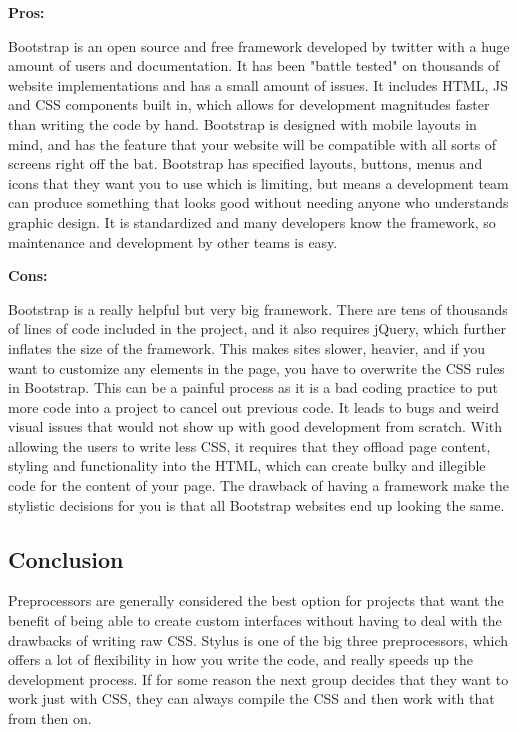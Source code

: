 \documentclass[draftclsnofoot,onecolumn,letterpaper,10pt,compsoc]{IEEEtran}
\begin{document}
    \noindent \textbf{Pros:}

    Bootstrap is an open source and free framework developed by twitter with a huge amount of users and documentation.\cite{bootstrap}
    It has been "battle tested" on thousands of website implementations and has a small amount of issues.
    It includes HTML, JS and CSS components built in, which allows for development magnitudes faster than writing the code by hand.
    Bootstrap is designed with mobile layouts in mind, and has the feature that your website will be compatible with all sorts of screens right off the bat.
    Bootstrap has specified layouts, buttons, menus and icons that they want you to use which is limiting, but means a development team can produce something that looks good without needing anyone who understands graphic design.
    It is standardized and many developers know the framework, so maintenance and development by other teams is easy.

    \noindent \textbf{Cons:}

    Bootstrap is a really helpful but very big framework.
    There are tens of thousands of lines of code included in the project, and it also requires jQuery, which further inflates the size of the framework.
    This makes sites slower, heavier, and if you want to customize any elements in the page, you have to overwrite the CSS rules in Bootstrap.\cite{BootstrapProCon}
    This can be a painful process as it is a bad coding practice to put more code into a project to cancel out previous code.
    It leads to bugs and weird visual issues that would not show up with good development from scratch.
    With allowing the users to write less CSS, it requires that they offload page content, styling and functionality into the HTML, which can create bulky and illegible code for the content of your page.
    The drawback of having a framework make the stylistic decisions for you is that all Bootstrap websites end up looking the same.

  \subsection{Conclusion}

    Preprocessors are generally considered the best option for projects that want the benefit of being able to create custom interfaces without having to deal with the drawbacks of writing raw CSS.
    Stylus is one of the big three preprocessors, which offers a lot of flexibility in how you write the code, and really speeds up the development process.
    If for some reason the next group decides that they want to work just with CSS, they can always compile the CSS and then work with that from then on.
\end{document}
